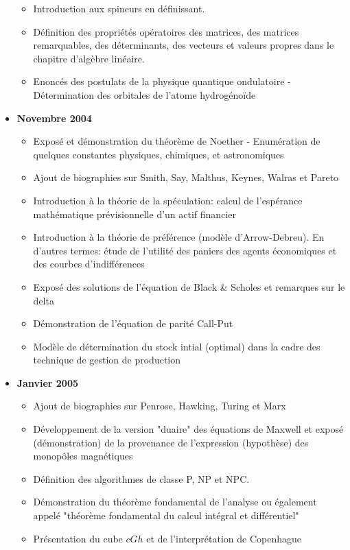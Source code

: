 \begin{itemize}
\begin{itemize}[noitemsep]
				\item Introduction aux spineurs en définissant.
				\item Définition des propriétés opératoires des matrices, des matrices remarquables, des déterminants, des vecteurs et valeurs propres dans le chapitre d'algèbre linéaire. 
				\item Enoncés des postulats de la physique quantique ondulatoire
- Détermination des orbitales de l'atome hydrogénoïde
			\end{itemize}
		\item \textbf{Novembre 2004}
			\begin{itemize}[noitemsep]
				\item Exposé et démonstration du théorème de Noether
- Enumération de quelques constantes physiques, chimiques, et astronomiques
				\item Ajout de biographies sur Smith, Say, Malthus, Keynes, Walras et Pareto
				\item Introduction à la théorie de la spéculation: calcul de l'espérance mathématique prévisionnelle d'un actif financier
				\item Introduction à la théorie de préférence (modèle d'Arrow-Debreu). En d'autres termes: étude de l'utilité des paniers des agents économiques et des courbes d'indifférences
				\item Exposé des solutions de l'équation de Black \& Scholes et remarques sur le delta
				\item Démonstration de l'équation de parité Call-Put
				\item Modèle de détermination du stock intial (optimal) dans la cadre des technique de gestion de production 
			\end{itemize}
		\item \textbf{Janvier 2005}
			\begin{itemize}[noitemsep]
				\item Ajout de biographies sur Penrose, Hawking, Turing et Marx
				\item Développement de la version "duaire" des équations de Maxwell et exposé (démonstration) de la provenance de l'expression (hypothèse) des monopôles magnétiques
				\item Définition des algorithmes de classe P, NP et NPC.
				\item Démonstration du théorème fondamental de l'analyse ou également appelé "théorème fondamental du calcul intégral et différentiel"
				\item Présentation du cube $cGh$ et de l'interprétation de Copenhague

\end{itemize}
\end{itemize}
